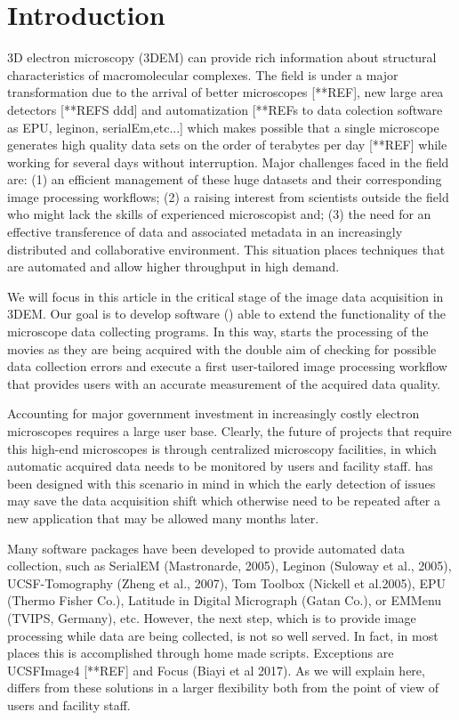 
\section{Introduction}

3D electron microscopy (3DEM)  can provide rich information about structural characteristics of macromolecular complexes. The field is under a major transformation due to the arrival of better microscopes [**REF], new large area detectors [**REFS ddd] and automatization [**REFs to data colection software as EPU, leginon, serialEm,etc...]  which makes possible that a single microscope generates high quality data sets on the order of terabytes per day [**REF] while working for several days without interruption. Major challenges faced in the field are: (1) an efficient management of these huge datasets and their corresponding image processing workflows; (2) a raising interest from scientists outside the field who might lack the skills of experienced microscopist and; (3) the need for an effective transference of data and associated metadata in an increasingly distributed and collaborative environment. This situation places techniques that are automated and allow higher throughput in high demand. 

We will focus in this article in the critical stage of the image data acquisition in 3DEM.  Our goal is  to develop software (\scipionbox) able to extend the functionality of the microscope data collecting programs. In this way, \scipionbox starts the processing of the movies as they are being acquired with the double aim of checking for possible data collection errors and execute a first user-tailored image processing workflow that provides users with an accurate measurement of the acquired data quality.

Accounting for major government investment in increasingly costly electron microscopes requires a large user  base. Clearly, the future of projects that require this high-end microscopes is through centralized microscopy facilities, in which automatic acquired data needs to be monitored by users and facility staff. \scipionbox has been designed with this scenario in mind in which the early detection of issues may save the data acquisition shift which otherwise need to be repeated after a new application that may be allowed many months later.

Many software packages have been developed to provide automated data collection, such as SerialEM (Mastronarde, 2005), Leginon (Suloway et al., 2005), UCSF-Tomography (Zheng et al., 2007), Tom Toolbox (Nickell et al.2005), EPU (Thermo Fisher Co.), Latitude in Digital Micrograph (Gatan Co.), or EMMenu
(TVIPS, Germany), etc. However, the next step,  which is to provide image processing while  data are being collected, is not so well served. In fact, in most places this is accomplished through home made scripts. Exceptions are UCSFImage4 [**REF] and Focus (Biayi et al 2017). As we will explain here, \scipionbox differs from these solutions in a larger flexibility both from the point of view of users and facility staff.
